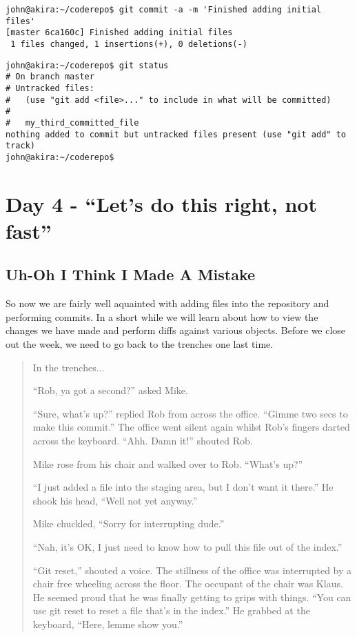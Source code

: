 \begin{verbatim} 
john@akira:~/coderepo$ git commit -a -m 'Finished adding initial files' 
[master 6ca160c] Finished adding initial files 
 1 files changed, 1 insertions(+), 0 deletions(-) 
\end{verbatim} 

\begin{verbatim} 
john@akira:~/coderepo$ git status 
# On branch master 
# Untracked files: 
#   (use "git add <file>..." to include in what will be committed) 
# 
#	my_third_committed_file 
nothing added to commit but untracked files present (use "git add" to track) 
john@akira:~/coderepo$ 
\end{verbatim} 

\section*{Day 4 - ``Let's do this right, not fast''}

\subsection*{Uh-Oh I Think I Made A Mistake}

So now we are fairly well aquainted with adding files into the repository and performing commits.  In a short while we will learn about how to view the changes we have made and perform diffs against various objects.  Before we close out the week, we need to go back to the trenches one last time.

\begin{quote}In the trenches...

``Rob, ya got a second?'' asked Mike.

``Sure, what's up?'' replied Rob from across the office.  ``Gimme two secs to make this commit.''  The office went silent again whilst Rob's fingers darted across the keyboard.  ``Ahh.  Damn it!'' shouted Rob.  

Mike rose from his chair and walked over to Rob.  ``What's up?''

``I just added a file into the staging area, but I don't want it there.''  He shook his head, ``Well not yet anyway.''

Mike chuckled, ``Sorry for interrupting dude.''

``Nah, it's OK, I just need to know how to pull this file out of the index.''

``Git reset,'' shouted a voice.  The stillness of the office was interrupted by a chair free wheeling across the floor.  The occupant of the chair was Klaus.  He seemed proud that he was finally getting to grips with things.  ``You can use git reset to reset a file that's in the index.''  He grabbed at the keyboard, ``Here, lemme show you.''
\end{quote}

